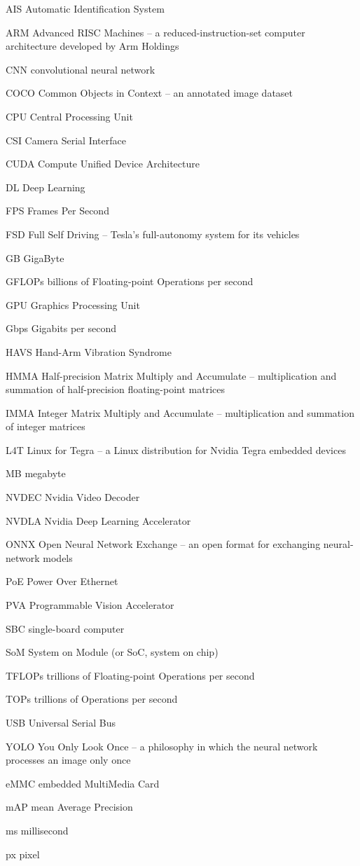 AIS Automatic Identification System

ARM Advanced RISC Machines -- a reduced-instruction-set computer architecture developed by Arm Holdings

CNN convolutional neural network

COCO Common Objects in Context -- an annotated image dataset

CPU Central Processing Unit

CSI Camera Serial Interface

CUDA Compute Unified Device Architecture

DL Deep Learning

FPS Frames Per Second

FSD Full Self Driving -- Tesla's full-autonomy system for its vehicles

GB GigaByte

GFLOPs billions of Floating-point Operations per second

GPU Graphics Processing Unit

Gbps Gigabits per second

HAVS Hand-Arm Vibration Syndrome

HMMA Half-precision Matrix Multiply and Accumulate -- multiplication and summation of half-precision floating-point matrices

IMMA Integer Matrix Multiply and Accumulate -- multiplication and summation of integer matrices

L4T Linux for Tegra -- a Linux distribution for Nvidia Tegra embedded devices

MB megabyte

NVDEC Nvidia Video Decoder

NVDLA Nvidia Deep Learning Accelerator

ONNX Open Neural Network Exchange -- an open format for exchanging neural-network models

PoE Power Over Ethernet

PVA Programmable Vision Accelerator

SBC single-board computer

SoM System on Module (or SoC, system on chip)

TFLOPs trillions of Floating-point Operations per second

TOPs trillions of Operations per second

USB Universal Serial Bus

YOLO You Only Look Once -- a philosophy in which the neural network processes an image only once

eMMC embedded MultiMedia Card

mAP mean Average Precision

ms millisecond

px pixel
